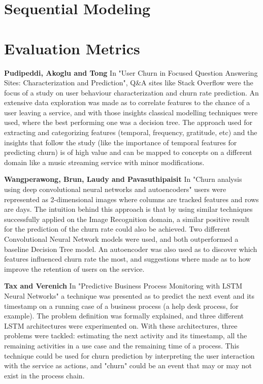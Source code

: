 \documentclass{kththesis}
\begin{document}
\section{Sequential Modeling}

\section{Evaluation Metrics}

\textbf{Pudipeddi, Akoglu and Tong} \citep{Pudipeddi2014} In "User Churn in Focused Question Answering Sites: Characterization and Prediction", Q\&A sites like Stack Overflow were the focus of a study on user behaviour characterization and churn rate prediction. An extensive data exploration was made as to correlate features to the chance of a user leaving a service, and with those insights classical modelling techniques were used, where the best performing one was a decision tree. The approach used for extracting and categorizing features (temporal, frequency, gratitude, etc) and the insights that follow the study (like the importance of temporal features for predicting churn) is of high value and can be mapped to concepts on a different domain like a music streaming service with minor modifications.

\textbf{Wangperawong, Brun, Laudy and Pavasuthipaisit} \citep{Wangperawong2016} In "Churn analysis using deep convolutional neural networks and autoencoders" users were represented as 2-dimensional images where columns are tracked features and rows are days. The intuition behind this approach is that by using similar techniques successfully applied on the Image Recognition domain, a similar positive result for the prediction of the churn rate could also be achieved. Two different Convolutional Neural Network models were used, and both outperformed a baseline Decision Tree model. An autoencoder was also used as to discover which features influenced churn rate the most, and suggestions where made as to how improve the retention of users on the service.

\textbf{Tax and Verenich} \citep{Tax2016} In "Predictive Business Process Monitoring with LSTM Neural Networks" a technique was presented as to predict the next event and its timestamp on a running case of a business process (a help desk process, for example). The problem definition was formally explained, and three different LSTM architectures were experimented on. With these architectures, three problems were tackled: estimating the next activity and its timestamp, all the remaining activities in a use case and the remaining time of a process. This technique could be used for churn prediction by interpreting the user interaction with the service as actions, and "churn" could be an event that may or may not exist in the process chain.
\end{document}
